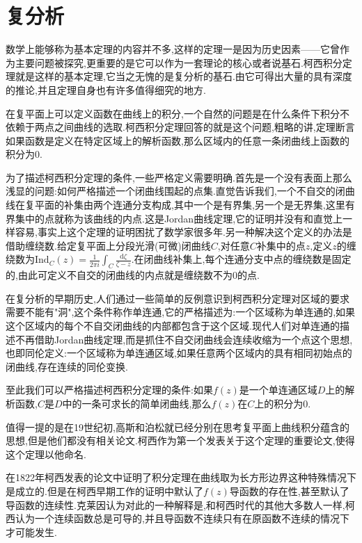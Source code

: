 \chapter{复分析}

数学上能够称为基本定理的内容并不多,这样的定理一是因为历史因素——它曾作为主要问题被探究,更重要的是它可以作为一套理论的核心或者说基石.柯西积分定理就是这样的基本定理,它当之无愧的是复分析的基石.由它可得出大量的具有深度的推论,并且定理自身也有许多值得细究的地方.

在复平面上可以定义函数在曲线上的积分,一个自然的问题是在什么条件下积分不依赖于两点之间曲线的选取.柯西积分定理回答的就是这个问题,粗略的讲,定理断言如果函数是定义在特定区域上的解析函数,那么区域内的任意一条闭曲线上函数的积分为0.

为了描述柯西积分定理的条件,一些严格定义需要明确.首先是一个没有表面上那么浅显的问题:如何严格描述一个闭曲线围起的点集.直觉告诉我们,一个不自交的闭曲线在复平面的补集由两个连通分支构成,其中一个是有界集,另一个是无界集,这里有界集中的点就称为该曲线的内点.这是Jordan曲线定理,它的证明并没有和直觉上一样容易,事实上这个定理的证明困扰了数学家很多年.另一种解决这个定义的办法是借助缠绕数.给定复平面上分段光滑(可微)闭曲线$C$,对任意$C$补集中的点$z$,定义$z$的缠绕数为$\mathrm{Ind}_C(z)=\frac{1}{2\pi i}\int_C\frac{\mathrm{d}\zeta}{\zeta-z}$.在闭曲线补集上,每个连通分支中点的缠绕数是固定的,由此可定义不自交的闭曲线的内点就是缠绕数不为0的点.

在复分析的早期历史,人们通过一些简单的反例意识到柯西积分定理对区域的要求需要不能有"洞",这个条件称作单连通,它的严格描述为:一个区域称为单连通的,如果这个区域内的每个不自交闭曲线的内部都包含于这个区域.现代人们对单连通的描述不再借助Jordan曲线定理,而是抓住不自交闭曲线会连续收缩为一个点这个思想,也即同伦定义:一个区域称为单连通区域,如果任意两个区域内的具有相同初始点的闭曲线,存在连续的同伦变换.

至此我们可以严格描述柯西积分定理的条件:如果$f(z)$是一个单连通区域$D$上的解析函数,$C$是$D$中的一条可求长的简单闭曲线,那么$f(z)$在$C$上的积分为0.

值得一提的是在19世纪初,高斯和泊松就已经分别在思考复平面上曲线积分蕴含的思想,但是他们都没有相关论文.柯西作为第一个发表关于这个定理的重要论文,使得这个定理以他命名.

在1822年柯西发表的论文中证明了积分定理在曲线取为长方形边界这种特殊情况下是成立的.但是在柯西早期工作的证明中默认了$f(z)$导函数的存在性,甚至默认了导函数的连续性.克莱因认为对此的一种解释是,和柯西时代的其他大多数人一样,柯西认为一个连续函数总是可导的,并且导函数不连续只有在原函数不连续的情况下才可能发生.

